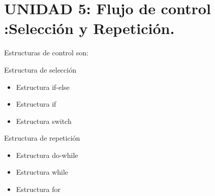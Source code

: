 \documentclass[presentation, aspectratio=54]{beamer}
\begin{document}
\section{UNIDAD 5: Flujo de control :Selección y Repetición.}
\label{sec:org207062c}
\begin{frame}[label={sec:org0670b4c}]{Estructuras de control son:}
\begin{block}{Estructura de selección}
\begin{itemize}
\item Estructura if-else
\item Estructura if
\item Estructura switch
\end{itemize}
\end{block}
\begin{block}{Estructura de repetición}
\begin{itemize}
\item Estructura do-while
\item Estructura while
\item Estructura for
\end{itemize}
\end{block}
\end{frame}
\end{document}
